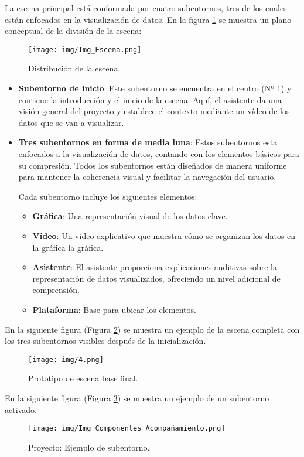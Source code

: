 \documentclass[a4paper, 12pt]{book}
\begin{document}
La escena principal está conformada por cuatro subentornos, tres de los cuales están enfocados en la visualización de datos.
En la figura \ref{fig:escena} se muestra un plano conceptual de la división de la escena:
\begin{figure}[H]
  \centering
  \texttt{[image: img/Img\_Escena.png]}
  \caption{Distribución de la escena.}
  \label{fig:escena}
\end{figure}
\begin{itemize}
    \item \textbf{Subentorno de inicio}: Este subentorno se encuentra en el centro (Nº 1) y  contiene la introducción y el inicio de la escena. Aquí, el asistente da una visión general del proyecto y establece el contexto mediante un vídeo de los datos que se van a visualizar.
    \item \textbf{Tres subentornos en forma de media luna}:
    Estos subentornos esta enfocados a la visualización de datos, contando con los elementos básicos para su compresión.
    Todos los subentornos están diseñados de manera uniforme para mantener la coherencia visual y facilitar la navegación del usuario.
    
    Cada subentorno incluye los siguientes elementos:
        \begin{itemize}
            \item \textbf{Gráfica}: Una representación visual de los datos clave.
            \item \textbf{Vídeo}: Un vídeo explicativo que muestra cómo se organizan los datos en la gráfica la gráfica.
            \item \textbf{Asistente}: El asistente proporciona explicaciones auditivas sobre la representación de datos visualizados, ofreciendo un nivel adicional de comprensión.
            \item \textbf{Plataforma}: Base para ubicar los elementos.
        \end{itemize}
\end{itemize}

En la siguiente figura (Figura \ref{fig:escena_completa}) se muestra un ejemplo de la escena completa con los tres subentornos visibles después de la inicialización.
\begin{figure}[H]
    \centering
    \texttt{[image: img/4.png]}
    \caption{Prototipo de escena base final.}
    \label{fig:escena_completa}
\end{figure}


En la siguiente figura (Figura \ref{fig:Img_Componentes_Acompañamiento}) se muestra un ejemplo de un subentorno activado.
\begin{figure}[H]
    \centering
    \texttt{[image: img/Img\_Componentes\_Acompañamiento.png]}
    \caption{Proyecto: Ejemplo de subentorno.}
    \label{fig:Img_Componentes_Acompañamiento}
\end{figure}
\end{document}
